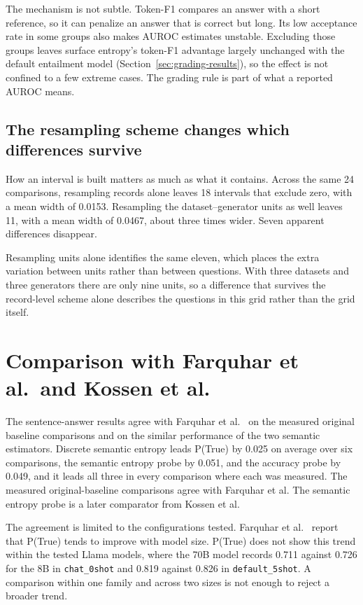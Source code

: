 The mechanism is not subtle. Token-F1 compares an answer with a short
reference, so it can penalize an answer that is correct but long. Its low
acceptance rate in some groups also makes AUROC estimates unstable. Excluding
those groups leaves surface entropy's token-F1 advantage largely unchanged with
the default entailment model (Section~\ref{sec:grading-results}), so the effect
is not confined to a few extreme cases. The grading rule is part of what a
reported AUROC means.

\subsection{The resampling scheme changes which differences survive}

How an interval is built matters as much as what it contains. Across the same
24 comparisons, resampling records alone leaves 18 intervals that exclude zero,
with a mean width of 0.0153. Resampling the dataset--generator units as well
leaves 11, with a mean width of 0.0467, about three times wider. Seven apparent
differences disappear.

Resampling units alone identifies the same eleven, which
places the extra variation between units rather than between questions. With
three datasets and three generators there are only nine units, so a difference
that survives the record-level scheme alone describes the questions in this
grid rather than the grid itself.

\section{Comparison with Farquhar et al.\ and Kossen et al.}
\label{sec:comparison-farquhar}
\label{sec:reproduction}

The sentence-answer results agree with Farquhar et
al.~\cite{semantic_entropy_nature_2024} on the measured original baseline
comparisons and on the similar performance of the two semantic estimators.
Discrete semantic entropy leads P(True) by 0.025 on average over six
comparisons, the semantic entropy probe by 0.051, and the accuracy probe by
0.049, and it leads all three in every comparison where each was measured.
The measured original-baseline comparisons agree with Farquhar et al.
The semantic entropy probe is a later comparator from Kossen et al.

The agreement is limited to the configurations tested. Farquhar et
al.~\cite{semantic_entropy_nature_2024} report that P(True) tends to improve
with model size. P(True) does not show this trend within the tested Llama
models, where the 70B model records 0.711 against 0.726 for the 8B in
\texttt{chat\_0shot} and 0.819 against 0.826 in \texttt{default\_5shot}. A
comparison within one family and across two sizes is not enough to reject a
broader trend.

